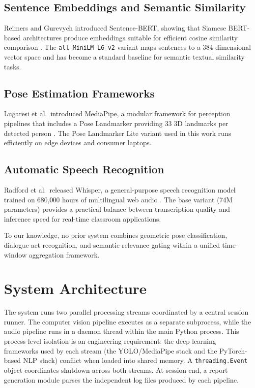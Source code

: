 \documentclass[conference]{IEEEtran}
\begin{document}
\subsection{Sentence Embeddings and Semantic Similarity}
Reimers and Gurevych introduced Sentence-BERT, showing that Siamese BERT-based architectures produce embeddings suitable for efficient cosine similarity comparison \cite{reimers2019}.
The \texttt{all-MiniLM-L6-v2} variant maps sentences to a 384-dimensional vector space and has become a standard baseline for semantic textual similarity tasks.

\subsection{Pose Estimation Frameworks}
Lugaresi et al.\ introduced MediaPipe, a modular framework for perception pipelines that includes a Pose Landmarker providing 33 3D landmarks per detected person \cite{lugaresi2019}.
The Pose Landmarker Lite variant used in this work runs efficiently on edge devices and consumer laptops.

\subsection{Automatic Speech Recognition}
Radford et al.\ released Whisper, a general-purpose speech recognition model trained on 680{,}000 hours of multilingual web audio \cite{radford2023}.
The base variant (74M parameters) provides a practical balance between transcription quality and inference speed for real-time classroom applications.

To our knowledge, no prior system combines geometric pose classification, dialogue act recognition, and semantic relevance gating within a unified time-window aggregation framework.

\section{System Architecture}

The system runs two parallel processing streams coordinated by a central session runner. The computer vision pipeline executes as a separate subprocess, while the audio pipeline runs in a daemon thread within the main Python process. This process-level isolation is an engineering requirement: the deep learning frameworks used by each stream (the YOLO/MediaPipe stack and the PyTorch-based NLP stack) conflict when loaded into shared memory. A \texttt{threading.Event} object coordinates shutdown across both streams. At session end, a report generation module parses the independent log files produced by each pipeline.
\end{document}
